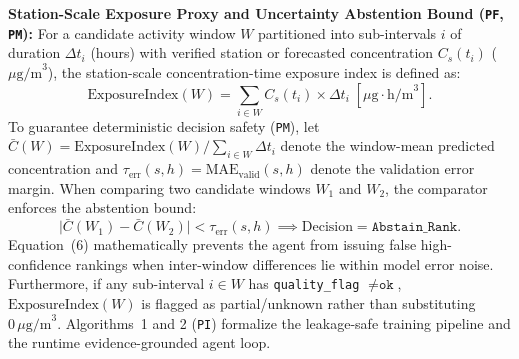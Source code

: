\textbf{Station-Scale Exposure Proxy and Uncertainty Abstention Bound (\texttt{PF}, \texttt{PM}):} For a candidate activity window $W$ partitioned into sub-intervals $i$ of duration $\Delta t_i$ (hours) with verified station or forecasted concentration $C_s(t_i)$ ($\mu\text{g/m}^3$), the station-scale concentration-time exposure index is defined as:
\begin{equation}
\text{ExposureIndex}(W) = \sum_{i \in W} C_s(t_i) \times \Delta t_i \; [\mu\text{g}\cdot\text{h/m}^3].
\end{equation}
To guarantee deterministic decision safety (\texttt{PM}), let $\bar{C}(W) = \text{ExposureIndex}(W) / \sum_{i \in W} \Delta t_i$ denote the window-mean predicted concentration and $\tau_{\text{err}}(s,h) = \text{MAE}_{\text{valid}}(s,h)$ denote the validation error margin. When comparing two candidate windows $W_1$ and $W_2$, the comparator enforces the abstention bound:
\begin{equation}
\big|\bar{C}(W_1) - \bar{C}(W_2)\big| < \tau_{\text{err}}(s,h) \implies \text{Decision} = \texttt{Abstain\_Rank}.
\end{equation}
Equation~(6) mathematically prevents the agent from issuing false high-confidence rankings when inter-window differences lie within model error noise. Furthermore, if any sub-interval $i \in W$ has \texttt{quality\_flag} $\neq \texttt{ok}$, $\text{ExposureIndex}(W)$ is flagged as partial/unknown rather than substituting $0\,\mu\text{g/m}^3$. Algorithms~1 and 2 (\texttt{PI}) formalize the leakage-safe training pipeline and the runtime evidence-grounded agent loop.

